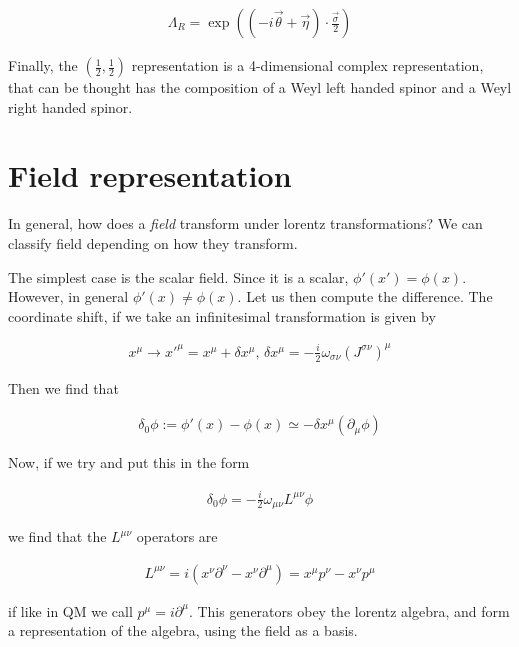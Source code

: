 \documentclass{report}
\begin{document}
\begin{align}
    \Lambda_R = \exp\left((-i\vec{\theta}+\vec{\eta})\cdot \frac{\vec{\sigma}}{2} \right)
\end{align}

Finally, the \(\left(\frac{1}{2}, \frac{1}{2} \right)\) representation is a 4-dimensional complex representation, that can be thought has the composition of a Weyl left handed spinor and a Weyl right handed spinor.

\section{Field representation}

In general, how does a \emph{field} transform under lorentz transformations? We can classify field depending on how they transform. 

The simplest case is the scalar field. Since it is a scalar, \(\phi'(x') = \phi(x)\). However, in general \(\phi'(x) \neq \phi(x)\). Let us then compute the difference. The coordinate shift, if we take an infinitesimal transformation is given by 

\begin{align}
    x^\mu \rightarrow x'^\mu = x^\mu + \delta x^\mu, \, \delta x^\mu = -\frac{i}{2}\omega_{\sigma\nu}(J^{\sigma \nu})^\mu
\end{align}

Then we find that 

\begin{align}
    \delta_0 \phi := \phi'(x) - \phi(x) \simeq -\delta x^{\mu} (\partial_\mu \phi)
\end{align}

Now, if we try and put this in the form 

\begin{align}
    \delta_0 \phi = -\frac{i}{2}\omega_{\mu\nu}L^{\mu\nu}\phi
\end{align}

we find that the \(L^{\mu\nu}\) operators are 

\begin{align}
    L^{\mu\nu} = i(x^\nu\partial^\nu - x^\nu \partial^\mu) = x^\mu p^\nu - x^\nu p^\mu
\end{align}

if like in QM we call \(p^\mu = i\partial^\mu\). This generators obey the lorentz algebra, and form a representation of the algebra, using the field as a basis. \\
\end{document}
